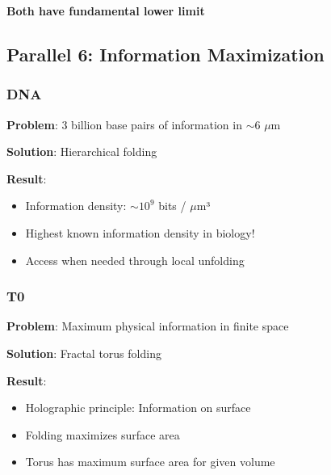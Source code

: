 	\begin{keyresult}
		\textbf{Both have fundamental lower limit}
		
		\begin{table}[H]
			\centering
		\end{table}
	\end{keyresult}
	
	\subsection{Parallel 6: Information Maximization}
	
	\subsubsection{DNA}
	
	\textbf{Problem}: 3 billion base pairs of information in $\sim$6 $\mu$m
	
	\textbf{Solution}: Hierarchical folding
	
	\textbf{Result}:
	\begin{itemize}
		\item Information density: $\sim 10^{9}$ bits / $\mu$m³
		\item Highest known information density in biology!
		\item Access when needed through local unfolding
	\end{itemize}
	
	\subsubsection{T0}
	
	\textbf{Problem}: Maximum physical information in finite space
	
	\textbf{Solution}: Fractal torus folding
	
	\textbf{Result}:
	\begin{itemize}
		\item Holographic principle: Information on surface
		\item Folding maximizes surface area
		\item Torus has maximum surface area for given volume
	\end{itemize}
	
